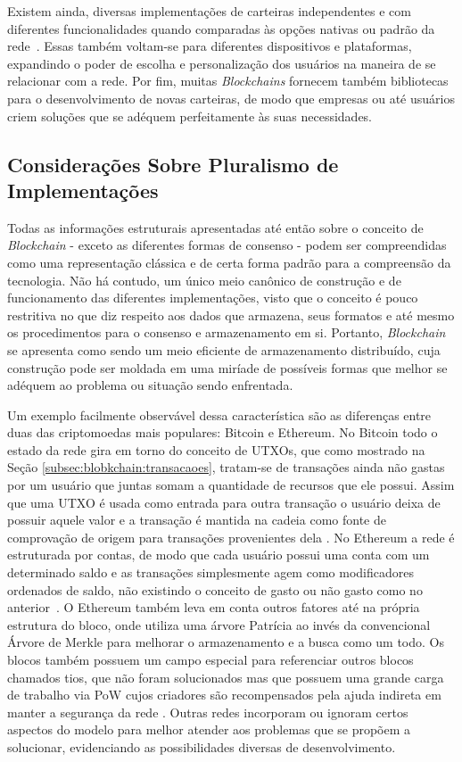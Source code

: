 %
Existem ainda, diversas implementações de carteiras independentes e com diferentes funcionalidades quando comparadas às opções nativas ou padrão da rede~\cite{blockchain:mastering_bitcoin}. Essas também voltam-se para diferentes dispositivos e plataformas, expandindo o poder de escolha e personalização dos usuários na maneira de se relacionar com a rede. Por fim, muitas \textit{Blockchains} fornecem também bibliotecas para o desenvolvimento de novas carteiras, de modo que empresas ou até usuários criem soluções que se adéquem perfeitamente às suas necessidades.

\subsection{Considerações Sobre Pluralismo de Implementações}
\label{subsec:blobkchain:implementacoes}

Todas as informações estruturais apresentadas até então sobre o conceito de \textit{Blockchain} - exceto as diferentes formas de consenso - podem ser compreendidas como uma representação clássica e de certa forma padrão para a compreensão da tecnologia. Não há contudo, um único meio canônico de construção e de funcionamento das diferentes implementações, visto que o conceito é pouco restritiva no que diz respeito aos dados que armazena, seus formatos e até mesmo os procedimentos para o consenso e armazenamento em si. Portanto, \textit{Blockchain} se apresenta como sendo um meio eficiente de armazenamento distribuído, cuja construção pode ser moldada em uma miríade de possíveis formas que melhor se adéquem ao problema ou situação sendo enfrentada.

Um exemplo facilmente observável dessa característica são as diferenças entre duas das criptomoedas mais populares: Bitcoin e Ethereum. 
%
No Bitcoin todo o estado da rede gira em torno do conceito de \acp{UTXO}, que como mostrado na Seção \ref{subsec:blobkchain:transacaoes}, tratam-se de transações ainda não gastas por um usuário que juntas somam a quantidade de recursos que ele possui. Assim que uma \ac{UTXO} é usada como entrada para outra transação o usuário deixa de possuir aquele valor e a transação é mantida na cadeia como fonte de comprovação de origem para transações provenientes dela \cite{blockchain:survey_bitcoin}. No Ethereum a rede é estruturada por contas, de modo que cada usuário possui uma conta com um determinado saldo e as transações simplesmente agem como modificadores ordenados de saldo, não existindo o conceito de gasto ou não gasto como no anterior~\cite{blockchain:mastering_ethereum}. O Ethereum também leva em conta outros fatores até na própria estrutura do bloco, onde utiliza uma árvore Patrícia ao invés da convencional Árvore de Merkle para melhorar o armazenamento e a busca como um todo. Os blocos também possuem um campo especial para referenciar outros blocos chamados tios, que não foram solucionados mas que possuem uma grande carga de trabalho via \ac{PoW} cujos criadores são recompensados pela ajuda indireta em manter a segurança da rede \cite{blockchain:ethereum}. 
 Outras redes incorporam ou ignoram certos aspectos do modelo para melhor atender aos problemas que se propõem a solucionar, evidenciando as possibilidades diversas de desenvolvimento.

